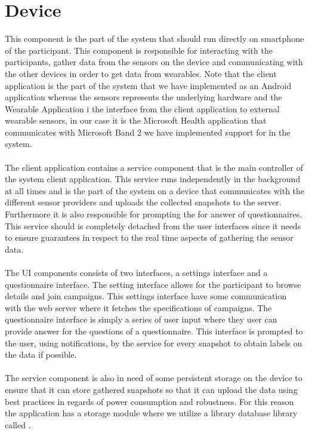 \section{Device}
\label{sec:device}
This component is the part of the system that should run directly on smartphone of the participant. This component is responsible for interacting with the participants, gather data from the sensors on the device and communicating with the other devices in order to get data from wearables. Note that the client application is the part of the system that we have implemented as an Android application whereas the sensors represents the underlying hardware and the Wearable Application i the interface from the client application to external wearable sensors, in our case it is the Microsoft Health application that communicates with Microsoft Band 2 we have implemented support for in the system.
\\\\
The client application contains a service component that is the main controller of the system client application. This service runs independently in the background at all times and is the part of the system on a device that communicates with the different sensor providers and uploads the collected snapshots to the server. Furthermore it is also responsible for prompting the for answer of questionnaires. This service should is completely detached from the user interfaces since it needs to ensure guarantees in respect to the real time aspects of gathering the sensor data.
\\\\
The UI components consists of two interfaces, a settings interface and a questionnaire interface. The setting interface allows for the participant to browse details and join campaigns. This settings interface have some communication with the web server where it fetches the specifications of campaigns. The questionnaire interface is simply a series of user input where they user can provide answer for the questions of a questionnaire. This interface is prompted to the user, using notifications, by the service for every snapshot to obtain labels on the data if possible.
\\\\
The service component is also in need of some persistent storage on the device to ensure that it can store gathered snapshots so that it can upload the data using best practices in regards of power consumption and robustness. For this reason the application has a storage module where we utilize a library database library called .
